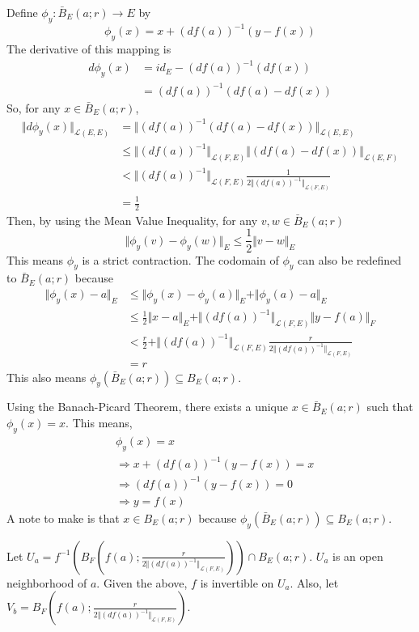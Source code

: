 \documentclass{article}
\begin{document}
Define \(\phi_y:\bar{B}_E(a;r)\to E\) by
\[\phi_y(x)=x+(df(a))^{-1}(y-f(x))\]
The derivative of this mapping is
\begin{align*}
    d\phi_y(x)&=id_E-(df(a))^{-1}(df(x))\\
    &=(df(a))^{-1}(df(a)-df(x))
\end{align*}
So, for any \(x\in\bar{B}_E(a;r)\),
\begin{align*}
    \Vert d\phi_y(x)\Vert_{\mathcal{L}(E,E)}&=\Vert(df(a))^{-1}(df(a)-df(x))\Vert_{\mathcal{L}(E,E)}\\
    &\leq\Vert(df(a))^{-1}\Vert_{\mathcal{L}(F,E)}\Vert(df(a)-df(x))\Vert_{\mathcal{L}(E,F)}\\
    &<\Vert(df(a))^{-1}\Vert_{\mathcal{L}(F,E)}\frac{1}{2\Vert(df(a))^{-1}\Vert_{\mathcal{L}(F,E)}}\\
    &=\frac{1}{2}
\end{align*}
Then, by using the Mean Value Inequality, for any \(v,w\in\bar{B}_E(a;r)\)
\[\Vert\phi_y(v)-\phi_y(w)\Vert_E\leq\frac{1}{2}\Vert v-w\Vert_E\]
This means \(\phi_y\) is a strict contraction.  The codomain of \(\phi_y\) can also be redefined to \(\bar{B}_E(a;r)\) because
\begin{align*}
    \Vert\phi_y(x)-a\Vert_E&\leq\Vert\phi_y(x)-\phi_y(a)\Vert_E +\Vert\phi_y(a)-a\Vert_E\\
    &\leq\frac{1}{2}\Vert x-a\Vert_E +\Vert(df(a))^{-1}\Vert_{\mathcal{L}(F,E)}\Vert y-f(a)\Vert_F\\
    &<\frac{r}{2}+\Vert(df(a))^{-1}\Vert_{\mathcal{L}(F,E)}\frac{r}{2\Vert(df(a))^{-1}\Vert_{\mathcal{L}(F,E)}}\\
    &=r
\end{align*}
This also means \(\phi_y(\bar{B}_E(a;r))\subseteq B_E(a;r)\).

Using the Banach-Picard Theorem, there exists a unique \(x\in\bar{B}_E(a;r)\) such that \(\phi_y(x)=x\).  This means,
\begin{align*}
    &\phi_y(x)=x\\
    &\Rightarrow x+(df(a))^{-1}(y-f(x))=x\\
    &\Rightarrow (df(a))^{-1}(y-f(x))=0\\
    &\Rightarrow y=f(x)
\end{align*}
A note to make is that \(x\in B_E(a;r)\) because \(\phi_y(\bar{B}_E(a;r))\subseteq B_E(a;r)\).

Let \(U_a=f^{-1}(B_F(f(a);\frac{r}{2\Vert(df(a))^{-1}\Vert_{\mathcal{L}(F,E)}}))\cap B_E(a;r)\).  \(U_a\) is an open neighborhood of \(a\).  Given the above, \(f\) is invertible on \(U_a\).  Also, let \(V_b=B_F(f(a);\frac{r}{2\Vert(df(a))^{-1}\Vert_{\mathcal{L}(F,E)}})\).
\end{document}
